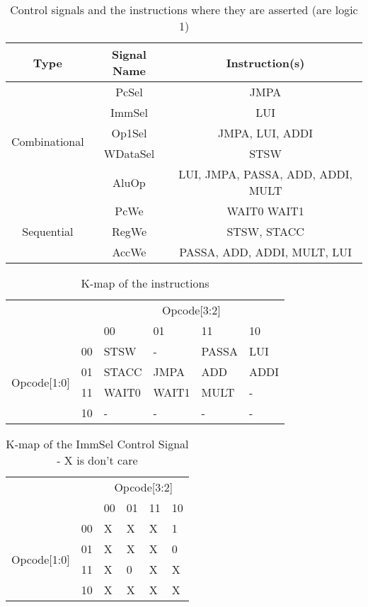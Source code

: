\begin{table}
\caption{Control signals and the instructions where they are asserted (are logic 1)}
\label{tab:controlsignals}
\centering
\begin{tabular}{|c|c|c|} \hline
Type & Signal Name & Instruction(s) \\ \hline
\multirow{5}{*}{Combinational} & PcSel & JMPA \\ 
 & ImmSel & LUI \\
 & Op1Sel & JMPA, LUI, ADDI \\
 & WDataSel & STSW \\ 
 & AluOp & LUI, JMPA, PASSA, ADD, ADDI, MULT \\ \hline
\multirow{3}{*}{Sequential} & PcWe & WAIT0 WAIT1 \\
 & RegWe & STSW, STACC \\
 & AccWe &  PASSA, ADD, ADDI, MULT, LUI \\ \hline

\end{tabular}
\end{table}



\begin{table}
\caption{K-map of the instructions}
\label{tab:kmap}
\centering
\begin{tabular}{|c|c|p{1.5cm}p{1.5cm}p{1.5cm}p{1.5cm}|}\cline{3-6}
\multicolumn{2}{c|}{} & \multicolumn{4}{|c|}{Opcode[3:2]} \\ \cline{3-6}
\multicolumn{2}{c|}{} 			& 00	& 01	& 11	& 10	\\  \hline
\multirow{4}{*}{Opcode[1:0]} 	& 00 	& STSW	& -	& PASSA	& LUI	\\
				& 01 	& STACC	& JMPA	& ADD	& ADDI	\\
				& 11 	& WAIT0	& WAIT1	& MULT	& -	\\
				& 10 	& -	& -	& -	& -	\\ \hline

\end{tabular}
\end{table}

\begin{table}
\caption{K-map of the ImmSel Control Signal - X is don't care}
\label{tab:kmap}
\centering
\begin{tabular}{|c|c|p{1.5cm}p{1.5cm}p{1.5cm}p{1.5cm}|}\cline{3-6}
\multicolumn{2}{c|}{} & \multicolumn{4}{|c|}{Opcode[3:2]} \\ \cline{3-6}
\multicolumn{2}{c|}{} 			& 00	& 01	& 11	& 10	\\  \hline
\multirow{4}{*}{Opcode[1:0]} 	& 00 	& X	& X	& X	& 1	\\
				& 01 	& X	& X	& X	& 0	\\
				& 11 	& X	& 0 	& X	& X	\\
				& 10 	& X	& X	& X	& X	\\ \hline

\end{tabular}
\end{table}

